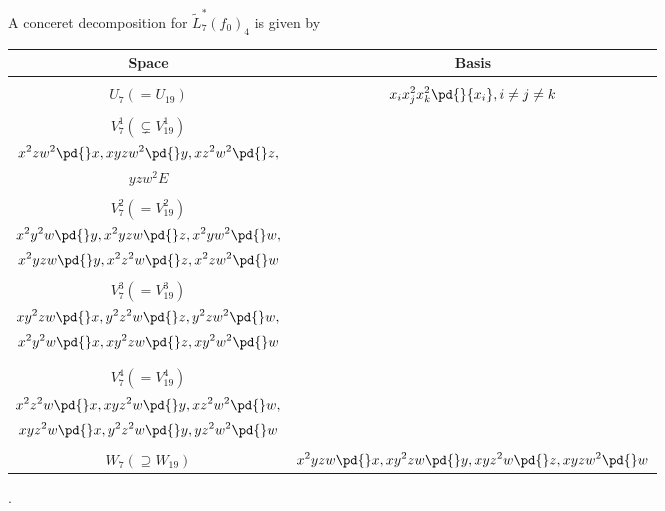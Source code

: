 	
	A conceret decomposition for $\tilde L^*_7(f_0)_4$ is given by
\begin{center}
\begin{longtable}{ c |  c }
Space &Basis \\
\hline
	&\\
$U_7(=U_{19})$ &  $\displaystyle x_ix_j^2x_k^2\pd{}{x_i}, i \not=j\not=k$\\
	&\\
$V_7^1(\subsetneq V_{19}^1)$ & 
\begin{tabular}{c}
	$\displaystyle 
	x^2yw^2\pd{}x,
	xy^2w^2\pd{}y,
	xyzw^2\pd{}z,$
\\
	$\displaystyle 
	x^2zw^2\pd{}x,
	xyzw^2\pd{}y,
	xz^2w^2\pd{}z,$\\
	$yzw^2E$
\end{tabular} \\
	&\\
$V_7^2(=V_{19}^2)$ &
\begin{tabular}{c}
	$\displaystyle 
	x^2y^2z\pd{}y,
	x^2yz^2\pd{}z,
	x^2yzw\pd{}w,$
\\
	$\displaystyle 
	x^2y^2w\pd{}y,
	x^2yzw\pd{}z,
	x^2yw^2\pd{}w,$\\
	$\displaystyle 
	x^2yzw\pd{}y,
	x^2z^2w\pd{}z,
	x^2zw^2\pd{}w$
\end{tabular} \\
	&\\
$V_7^3(=V_{19}^3)$ &
\begin{tabular}{c}
	$\displaystyle
	x^2y^2z\pd{}x,
	xy^2z^2\pd{}z,
	xy^2zw\pd{}w,$\\
	$\displaystyle
	xy^2zw\pd{}x,
	y^2z^2w\pd{}z,
	y^2zw^2\pd{}w,$\\
	$\displaystyle
	x^2y^2w\pd{}x,
	xy^2zw\pd{}z,
	xy^2w^2\pd{}w$\\
\end{tabular} \\
	&\\
$V_7^4(=V_{19}^4)$ & 
\begin{tabular}{c}
	$\displaystyle
	x^2yz^2\pd{}x,
	xy^2z^2\pd{}y,
	xyz^2w\pd{}w,$\\
	$\displaystyle
	x^2z^2w\pd{}x,
	xyz^2w\pd{}y,
	xz^2w^2\pd{}w,$\\
	$\displaystyle
	xyz^2w\pd{}x,
	y^2z^2w\pd{}y,
	yz^2w^2\pd{}w$
\end{tabular} \\
	&\\
$W_7(\supseteq W_{19})$ & 	
	$\displaystyle 
	x^2yzw\pd{}x,
	xy^2zw\pd{}y,
	xyz^2w\pd{}z,
	xyzw^2\pd{}w$ 
\end{longtable}.
\end{center}
